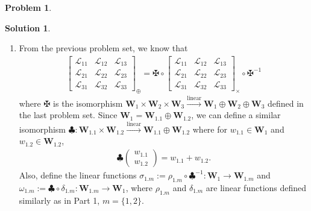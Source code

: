 \documentclass{book}
\theoremstyle{definition}
\newtheorem*{prob*}{Problem}
\newtheorem*{sln*}{Solution}
\newcommand{\W}{\mathbf{W}}
\newcommand{\lag}{\mathcal{L}}
\newcommand{\lin}{\overset{\text{linear}}{\longrightarrow}}
\begin{document}
\begin{prob*}
\begin{sln*}
\begin{enumerate}
		\item From the previous problem set, we know that
		\begin{align*}
		\begin{bmatrix}
		\lag_{11} & \lag_{12} & \lag_{13}\\
		\lag_{21} & \lag_{22} & \lag_{23}\\
		\lag_{31} & \lag_{32} & \lag_{33}
		\end{bmatrix}_\oplus = \maltese \circ \begin{bmatrix}
		\lag_{11} & \lag_{12} & \lag_{13}\\
		\lag_{21} & \lag_{22} & \lag_{23}\\
		\lag_{31} & \lag_{32} & \lag_{33}
		\end{bmatrix}_\times \circ \maltese^{-1}
		\end{align*}
		where $\maltese$ is the isomorphism $\W_1 \times \W_2 \times \W_3 \lin \W_1\oplus\W_2\oplus\W_3$ defined in the last problem set. Since $\W_1 = \W_{1.1}\oplus\W_{1.2}$, we can define a similar isomorphism $\clubsuit : \W_{1.1}\times \W_{1.2} \lin \W_{1.1}\oplus\W_{1.2}$ where for $w_{1.1}\in \W_1$ and $w_{1.2}\in \W_{1.2}$,
		\begin{align*}
		\clubsuit\begin{pmatrix}
		w_{1.1}\\w_{1.2}
		\end{pmatrix} = w_{1.1} + w_{1.2}.
		\end{align*}
		Also, define the linear functions $\sigma_{1.m} := \rho_{1.m}\circ \clubsuit^{-1} : \W_1 \to \W_{1.m}$ and $\omega_{1.m} := \clubsuit \circ \delta_{1.m} : \W_{1.m} \to \W_{1}$, where $\rho_{1.m}$ and $\delta_{1.m}$ are linear functions defined similarly as in Part 1, $m=\{1,2\}$. \\  
		

\end{enumerate}
\end{sln*}
\end{prob*}
\end{document}
